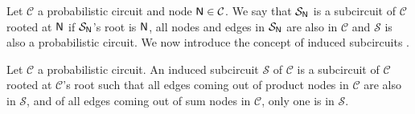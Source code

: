Let $\mathcal{C}$ a probabilistic circuit and node $\operatorname{\textsf{N}}\in\mathcal{C}$. We say that
$\mathcal{S}_{\operatorname{\textsf{N}}}$ is a subcircuit of $\mathcal{C}$ rooted at $\operatorname{\textsf{N}}$ if $\mathcal{S}_{\operatorname{\textsf{N}}}$'s
root is $\operatorname{\textsf{N}}$, all nodes and edges in $\mathcal{S}_{\operatorname{\textsf{N}}}$ are also in $\mathcal{C}$ and
$\mathcal{S}$ is also a probabilistic circuit. We now introduce the concept of induced subcircuits
\citep{chan06,dennis15,peharz14}.

\begin{definition}
  Let $\mathcal{C}$ a probabilistic circuit. An induced subcircuit $\mathcal{S}$ of $\mathcal{C}$
  is a subcircuit of $\mathcal{C}$ rooted at $\mathcal{C}$'s root such that all edges coming out of
  product nodes in $\mathcal{C}$ are also in $\mathcal{S}$, and of all edges coming out of sum
  nodes in $\mathcal{C}$, only one is in $\mathcal{S}$.
\end{definition}

